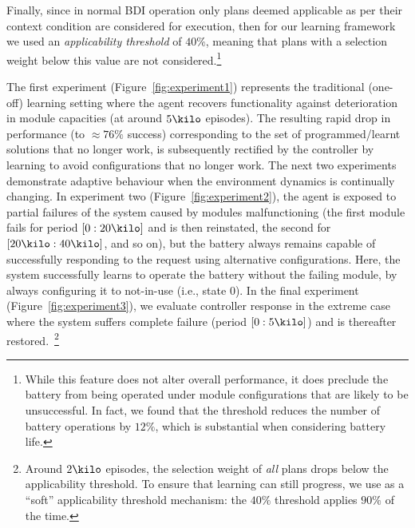 Finally, since in normal BDI operation only plans deemed applicable as per their context condition are considered for execution, then for our learning framework we used an \emph{applicability threshold} of $40\%$, meaning that plans with a selection weight below this value are not considered.\footnote{While this feature does not alter overall performance, it does preclude the battery from being operated under module configurations that are likely to be unsuccessful. In fact, we found that the threshold reduces the number of battery operations by $12\%$, which is substantial when considering battery life.}

The first experiment (Figure~\ref{fig:experiment1}) represents the traditional (one-off) learning setting where the agent recovers functionality against deterioration in module capacities (at around $5\kilo$ episodes). 
%
%
The resulting rapid drop in performance (to $\approx 76\%$ success) corresponding to the set of programmed/learnt solutions that no longer work, is subsequently rectified by the controller by learning to avoid configurations that no longer work. 
%
The next two experiments demonstrate adaptive behaviour when the environment dynamics is continually changing.
%
In experiment two (Figure~\ref{fig:experiment2}), the agent is exposed to partial failures of the system caused by modules malfunctioning (the first module fails for period $[0:20\kilo]$ and is then reinstated, the second for  $[20\kilo:40\kilo]$, and so on), but the battery always remains capable of successfully responding to the request using alternative configurations. Here, the system successfully learns to operate the battery without the failing module, by always configuring it to not-in-use (i.e., state $0$).
%
In the final experiment (Figure~\ref{fig:experiment3}), we evaluate controller response in the extreme case where the system suffers complete failure (period $[0:5\kilo]$) and is thereafter restored.~\footnote{Around $2\kilo$ episodes, the selection weight of {\em all} plans drops below the applicability threshold. To ensure that learning can still progress, we use as a ``soft'' applicability threshold mechanism: the $40\%$ threshold applies $90\%$ of the time.}

